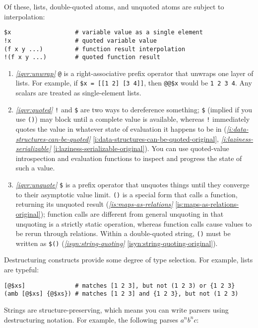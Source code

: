 \documentclass{report}
\makeatletter
\newcommand*{\Label}[2]{%
  \@bsphack
  \begingroup
    \label{#1-original}%
    \def\@currentlabel{#2}%
    \label{#1}%
  \endgroup
  \@esphack
}
\newcommand{\refboth}[1]{{\em \ref{#1}} \ref{#1-original}}
\makeatother
\begin{document}
  Of these, lists, double-quoted atoms, and unquoted atoms are subject to
  interpolation:

\begin{verbatim}
$x                  # variable value as a single element
!x                  # quoted variable value
(f x y ...)         # function result interpolation
!(f x y ...)        # quoted function result
\end{verbatim}

\begin{enumerate}
\item{}\Label{iqvr:unwrap}{qvr.unwrap}{\em\ref{iqvr:unwrap}}
  \verb|@| is a right-associative prefix operator that unwraps one layer of
  lists. For example, if \verb|$x = [[1 2] [3 4]]|, then \verb|@@$x| would
  be \verb|1 2 3 4|. Any scalars are treated as single-element lists.
\item{}\Label{iqvr:quoted}{qvr.quoted}{\em\ref{iqvr:quoted}}
  \verb|!| and \verb|$| are two ways to dereference something; \verb|$|
  (implied if you use \verb|()|) may block until a complete value is
  available, whereas \verb|!| immediately quotes the value in whatever
  state of evaluation it happens to be in
  (\refboth{i:data-structures-can-be-quoted},
  \refboth{i:laziness-serializable}). You can use quoted-value
  introspection and evaluation functions to inspect and progress the state
  of such a value.
\item{}\Label{iqvr:unquote}{qvr.unquote}{\em\ref{iqvr:unquote}}
  \verb|$| is a prefix operator that unquotes things until they converge to
  their asymptotic value limit. \verb|()| is a special form that calls a
  function, returning its unquoted result (\refboth{is:maps-as-relations});
  function calls are different from general unquoting in that unquoting is
  a strictly static operation, whereas function calls cause values to be
  rerun through relations. Within a double-quoted string, \verb|()| must be
  written as \verb|$()| (\refboth{isyn:string-quoting}).
\end{enumerate}

  Destructuring constructs provide some degree of type selection. For example,
  lists are typeful:

\begin{verbatim}
[@$xs]              # matches [1 2 3], but not (1 2 3) or {1 2 3}
(amb [@$xs] {@$xs}) # matches [1 2 3] and {1 2 3}, but not (1 2 3)
\end{verbatim}

  Strings are structure-preserving, which means you can write parsers using
  destructuring notation. For example, the following parses $a^nb^nc$:
\end{document}
